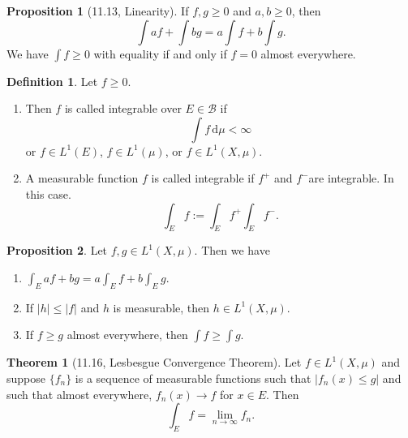 \documentclass[12pt]{article}
\newcommand{\B}{\mathcal{B}}
\newcommand{\dif}{\, \mathrm{d}}
\newcommand{\abs}[1]{\left\lvert #1 \right\rvert}
\theoremstyle{definition}
\newtheorem*{thm}{Theorem}
\newtheorem*{definition}{Definition}
\newtheorem*{prop}{Proposition}
\begin{document}
\begin{prop}[11.13, Linearity]

  If \( f, g \geq 0 \) and \( a,b \geq 0 \), then
    \[  
        \int af + \int bg = a \int f + b \int g.
    \]
  We have \( \displaystyle \int f \geq 0 \) with equality if and only if \( f = 0 \) almost everywhere. 

\end{prop}

\begin{definition}
      Let \( f \geq 0 \). 
      
        \begin{enumerate}[label = (\arabic{*})]
          \item Then \( f \) is called integrable over \( E \in \B \) if
            \[
                \int f \dif \mu < \infty
            \]
          or \( f \in L^1(E) \), \( f \in L^1(\mu) \), or \( f \in L^1(X, \mu) \).
          \item A measurable function \( f \) is called integrable if \( f^+ \) and \( f^- \)are integrable. In this case.
            \[
                \int_{E} f := \int_{E} f^+ \int_{E} f^-.
            \]
        \end{enumerate}

\end{definition}

\begin{prop}

  Let \( f,g \in L^1(X, \mu) \).
  Then we have 
    \begin{enumerate}[label = (\arabic{*})]
      \item \( \displaystyle \int_{E} af + bg = a \int_{E} f + b \int_{E} g \).
      \item If \( \abs{h} \leq \abs{f} \) and \( h \) is measurable, then
       \( h \in L^1(X, \mu )\).
       \item If \( f \geq g \) almost everywhere, then \( \displaystyle \int f \geq \int g \).
    \end{enumerate}

\end{prop}

\begin{thm}[11.16, Lesbesgue Convergence Theorem]

    Let \( f \in L^1(X, \mu) \) and suppose \( \{f_n\} \) is a sequence of measurable functions such that \( \abs{f_n(x) \leq g } \) and such that almost everywhere, \( f_n(x) \to f \) for \( x \in E \). Then
      \[  
          \int_{E} f = \lim_{n \to \infty} f_n.
      \]
  
\end{thm}
\end{document}
